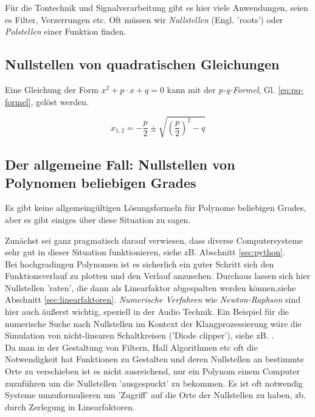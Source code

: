 Für die Tontechnik und Signalverarbeitung gibt es hier viele Anwendungen, seien es Filter, Verzerrungen etc. Oft müssen wir \emph{Nullstellen} (Engl. 'roots') oder \emph{Polstellen} einer Funktion finden. 

\subsection{Nullstellen von quadratischen Gleichungen}

Eine Gleichung der Form $x^2 + p \cdot x + q = 0$ kann mit der \emph{p-q-Formel}, Gl. \ref{eq:pq-formel}, gelöst werden.


\begin{equation}
x_{1,2} = -\frac{p}{2} \pm \sqrt{\left( \frac{p}{2} \right)^2 - q } \label{eq:pq-formel}
\end{equation}

\subsection{Der allgemeine Fall: Nullstellen von Polynomen beliebigen Grades}
Es gibt keine allgemeingültigen Lösungsformeln für Polynome beliebigen Grades, aber es gibt einiges über diese Situation zu sagen.



Zunächst sei ganz pragmatisch darauf verwiesen, dass diverse Computersysteme sehr gut in dieser Situation funktionieren, siehe zB. Abschnitt \ref{sec:python}. \\
Bei hochgradingen Polynomen ist es sicherlich ein guter Schritt sich den Funktionsverlauf zu plotten und den Verlauf anzusehen. Durchaus lassen sich hier Nullstellen 'raten', die dann als Linearfaktor abgespalten werden können,siehe Abschnitt \ref{sec:linearfaktoren}. \emph{Numerische Verfahren} wie \emph{Newton-Raphson} sind hier auch äußerst wichtig, speziell in der Audio Technik. Ein Beispiel für die numerische Suche nach Nullstellen im Kontext der Klangprozessierung wäre die Simulation von nicht-linearen Schaltkreisen ('Diode clipper'), siehe zB. \cite{holmes2015improving}. \\

Da man in der Gestaltung von Filtern, Hall Algorithmen etc oft die Notwendigkeit hat Funktionen zu Gestalten und deren Nullstellen an bestimmte Orte zu verschieben ist es nicht ausreichend, nur ein Polynom einem Computer zuzuführen um die Nullstellen 'ausgespuckt' zu bekommen. Es ist oft notwendig Systeme umzuformulieren um 'Zugriff' auf die Orte der Nullstellen zu haben, zb. durch Zerlegung in Linearfaktoren. 


